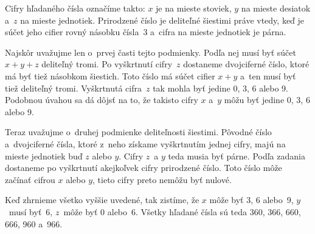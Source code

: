 {%
Cifry hľadaného čísla označíme takto: $x$ je na mieste stoviek, $y$ na mieste
desiatok a~$z$ na mieste jednotiek. Prirodzené číslo je deliteľné šiestimi práve vtedy,
keď je súčet jeho cifier rovný násobku čísla~3 a~cifra na mieste jednotiek je párna.

Najskôr uvažujme len o~prvej časti tejto podmienky. Podľa nej musí byť súčet
${x + y + z}$ deliteľný tromi. Po vyškrtnutí cifry~$z$ dostaneme
dvojciferné číslo, ktoré má byť tiež násobkom šiestich. Toto číslo má súčet
cifier $x + y$ a~ten musí byť tiež deliteľný tromi. Vyškrtnutá cifra~$z$ tak
mohla byť jedine 0, 3, 6 alebo 9. Podobnou úvahou sa dá dôjsť na to, že takisto cifry
$x$ a~$y$ môžu byť jedine 0, 3, 6 alebo 9.

Teraz uvažujme o~druhej podmienke deliteľnosti šiestimi. Pôvodné číslo
a~dvojciferné čísla, ktoré z~neho získame vyškrtnutím jednej cifry, majú na mieste jednotiek
buď $z$ alebo $y$. Cifry $z$~a $y$ teda musia byť párne.
Podľa zadania dostaneme po vyškrtnutí akejkoľvek cifry prirodzené číslo. Toto číslo môže začínať
cifrou $x$ alebo $y$, tieto cifry preto nemôžu byť nulové.

Keď zhrnieme všetko vyššie uvedené, tak zistíme, že $x$ môže byť 3, 6 alebo~9, $y$~musí byť~6, $z$~môže byť
0 alebo~6. Všetky hľadané čísla sú teda 360, 366, 660, 666, 960 a~966.
}

